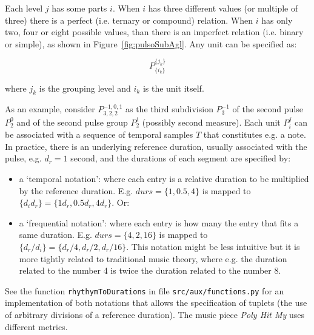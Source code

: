\documentclass[format=acmsmall, review=false, screen=true]{acmart}
\begin{document}
Each level $j$ has some parts $i$. When $i$ has three different
values (or multiple of three) there is a perfect (i.e. ternary or compound) relation. When $i$ has only
two, four or eight possible values, than there is an imperfect relation (i.e. binary or simple),
as shown in Figure~\ref{fig:pulsoSubAgl}. Any unit can be
specified as:

\begin{equation}\label{eq:rhythmicUnit}
P^{ \{ j_k \} }_{ \{ i_{k} \}}
\end{equation}

\noindent where $j_k$ is the grouping level and $i_k$ is the unit itself.

As an example, consider $P^{-1,0,1}_{3,2,2}$ as the third subdivision $P^{-1}_3$ of the
second pulse $P^0_2$ and of the second pulse group $P^1_2$ (possibly second measure).
Each unit $P_i^j$ can be associated with a sequence of temporal samples $T$ that constitutes e.g. a
note.
In practice, there is an underlying reference duration, usually associated with the pulse,
e.g. $d_r=1$ second, and the durations of each segment are specified by:
\begin{itemize}
	\item a `temporal notation': where each entry is a relative duration to
		be multiplied by the reference duration. E.g. $durs=\{1,0.5,4\}$
		is mapped to $\{d_id_r\} = \{1d_r, 0.5d_r, 4d_r\}$. Or:
	\item a `frequential notation': where each entry is how many the
		entry that fits a same duration. E.g. $durs=\{4, 2, 16\}$
		is mapped to $\{d_r/d_i\} = \{d_r/4, d_r/2, d_r/16\}$.
		This notation might be less intuitive but it is more tightly
		related to traditional music theory, where e.g. the duration related
		to the number 4 is twice the duration related to the number 8.
\end{itemize}
See the function \texttt{rhythymToDurations} in file \texttt{src/aux/functions.py}
for an implementation of both notations that allows the specification of tuplets
(the use of arbitrary divisions of a reference duration).
The music piece \emph{Poly Hit My} uses different metrics.~\cite{MASSA}
\end{document}
